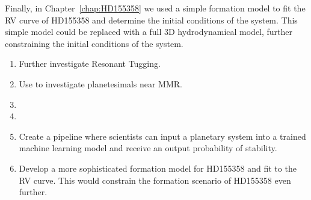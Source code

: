 Finally, in Chapter~\ref{chap:HD155358} we used a simple formation model to fit the RV curve of HD155358 and determine the initial conditions of the system. 
This simple model could be replaced with a full 3D hydrodynamical model, further constraining the initial conditions of the system. 

\begin{enumerate}
\item Further investigate Resonant Tugging.
\item Use \hermes to investigate planetesimals near MMR.
\item {}
\item {}
\item Create a pipeline where scientists can input a planetary system into a trained machine learning model and receive an output probability of stability. 
\item Develop a more sophisticated formation model for HD155358 and fit to the RV curve. This would constrain the formation scenario of HD155358 even further.
\end{enumerate}
